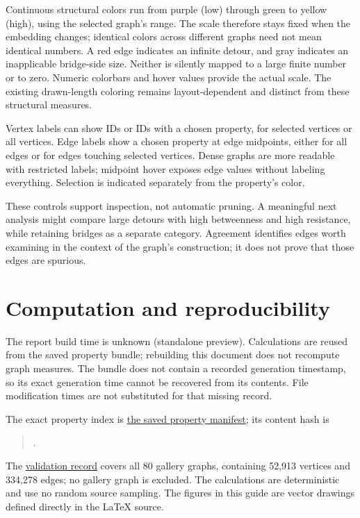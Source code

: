 \documentclass[11pt]{article}
\providecommand{\reportbuilddatetime}{unknown (standalone preview)}
\begin{document}
Continuous structural colors run from purple (low) through green to yellow (high), using the selected graph's range. The scale therefore stays fixed when the embedding changes; identical colors across different graphs need not mean identical numbers. A red edge indicates an infinite detour, and gray indicates an inapplicable bridge-side size. Neither is silently mapped to a large finite number or to zero. Numeric colorbars and hover values provide the actual scale. The existing drawn-length coloring remains layout-dependent and distinct from these structural measures.

Vertex labels can show IDs or IDs with a chosen property, for selected vertices or all vertices. Edge labels show a chosen property at edge midpoints, either for all edges or for edges touching selected vertices. Dense graphs are more readable with restricted labels; midpoint hover exposes edge values without labeling everything. Selection is indicated separately from the property's color.

These controls support inspection, not automatic pruning. A meaningful next analysis might compare large detours with high betweenness and high resistance, while retaining bridges as a separate category. Agreement identifies edges worth examining in the context of the graph's construction; it does not prove that those edges are spurious.

\clearpage
\appendix
\section{Computation and reproducibility}\label{sec:reproduce}
The report build time is \reportbuilddatetime. Calculations are reused from the saved property bundle; rebuilding this document does not recompute graph measures. The bundle does not contain a recorded generation timestamp, so its exact generation time cannot be recovered from its contents. File modification times are not substituted for that missing record.

The exact property index is \href{file:///Users/pgajer/current_projects/suitesparse_embedding_comparison/graph_properties/ca5c83e2d2e9db7a9f41c234c1694c4d76911279acec9adb2a566db23e4f3982.json}{the saved property manifest}; its content hash is
\begin{quote}\small{}.\end{quote}
The \href{file:///Users/pgajer/current_projects/suitesparse_embedding_comparison/graph_measures_30_sept_2026/validation.json}{validation record} covers all 80 gallery graphs, containing 52,913 vertices and 334,278 edges; no gallery graph is excluded. The calculations are deterministic and use no random source sampling. The figures in this guide are vector drawings defined directly in the LaTeX source.
\end{document}
